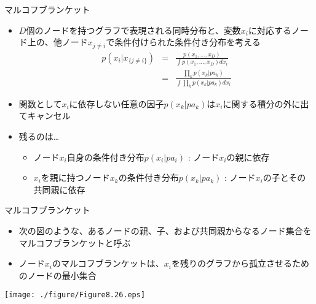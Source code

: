 \begin{frame}{マルコフブランケット}
 \begin{itemize}
  \item $D$個のノードを持つグラフで表現される同時分布と、変数$x_i$に対応するノード上の、他ノード$x_{j \neq i}$で条件付けられた条件付き分布を考える
        \begin{eqnarray*}
         p(x_i|x_{\{j \neq i\}}) &=& \frac{p(x_1,...,x_D)}{\int p(x_1,...,x_D)dx_i}\\
         & =& \frac{\prod_k p(x_k|pa_k)}{\int \prod_k p(x_k|pa_k) dx_i}
        \end{eqnarray*}
  \item 関数として$x_i$に依存しない任意の因子$p(x_k|pa_k)$は$x_i$に関する積分の外に出てキャンセル
  \item 残るのは…
        \begin{itemize}
         \item ノード$x_i$自身の条件付き分布$p(x_i|pa_i)$ : \alert{ノード$x_i$の親に依存}
         \item $x_i$を親に持つノード$x_k$の条件付き分布$p(x_k|pa_k)$ : \alert{ノード$x_i$の子とその共同親に依存}
        \end{itemize}
 \end{itemize}
\end{frame}

\begin{frame}{マルコフブランケット}
 \begin{itemize}
  \item 次の図のような、あるノードの親、子、および共同親からなるノード集合を\alert{マルコフブランケット}と呼ぶ
  \item ノード$x_i$のマルコフブランケットは、$x_i$を残りのグラフから孤立させるためのノードの最小集合
 \end{itemize}
 \texttt{[image: ./figure/Figure8.26.eps]}
\end{frame}
